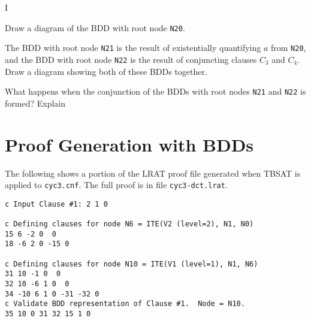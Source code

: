 \begin{problem}{I}
\begin{choice}
\item Draw a diagram of the BDD with root node \texttt{N20}.
\solution{1.5in}{\begin{center}\end{center}}

\item The BDD with root node \texttt{N21} is the result of existentially quantifying $a$ from \texttt{N20}, and
the BDD with root node \texttt{N22} is the result of conjuncting clauses $C_3$ and $C_4$.  
Draw a diagram showing both of these BDDs together.
\solution{1.5in}{\begin{center}\end{center}}

\item What happens when the conjunction of the BDDs with root nodes \texttt{N21} and \texttt{N22} is formed?  Explain

\end{choice}
\end{problem}

\newpage
\section*{Proof Generation with BDDs}

The following shows a portion of the LRAT proof file generated when TBSAT is applied to \texttt{cyc3.cnf}.
The full proof is in file \texttt{cyc3-dct.lrat}.
\begin{lstlisting}
c Input Clause #1: 2 1 0

c Defining clauses for node N6 = ITE(V2 (level=2), N1, N0)
15 6 -2 0  0
18 -6 2 0 -15 0

c Defining clauses for node N10 = ITE(V1 (level=1), N1, N6)
31 10 -1 0  0
32 10 -6 1 0  0
34 -10 6 1 0 -31 -32 0
c Validate BDD representation of Clause #1.  Node = N10.
35 10 0 31 32 15 1 0
\end{lstlisting}


